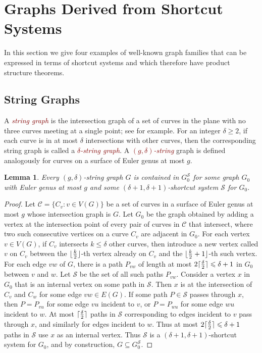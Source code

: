 \documentclass{patmorin}
\theoremstyle{plain}
\newtheorem{lem}[thm]{Lemma}
\theoremstyle{definition}
\newcommand{\defin}[1]{\textcolor{Maroon}{\emph{#1}}}
\DeclarePairedDelimiter{\ceil}{\lceil}{\rceil}
\DeclarePairedDelimiter{\floor}{\lfloor}{\rfloor}
\renewcommand{\SS}{\mathcal{S}}
\renewcommand{\geq}{\geqslant}
\renewcommand{\leq}{\leqslant}
\begin{document}
\section{Graphs Derived from Shortcut Systems}
\label{examples}

In this section we give four examples of well-known graph families that can be expressed in terms of shortcut systems and which therefore have product structure theorems.


\subsection{String Graphs}
\label{first_example}

A \defin{string graph} is the intersection graph of a set of curves in the plane with no three curves meeting at a single point; see  \cite{PachToth-DCG02,FP10,FP14} for example. For an integer $\delta\geq 2$, if each curve is in at most $\delta$ intersections with other curves, then the corresponding string graph is called a \defin{$\delta$-string graph}. A \defin{$(g,\delta)$-string} graph is defined analogously for curves on a surface of Euler genus at most $g$.

\begin{lem}
\label{StringShortcut}
Every $(g,\delta)$-string graph $G$ is contained in $G_0^\SS$ for some graph $G_0$ with Euler genus at most $g$ and some $(\delta+1,\delta+1 )$-shortcut system $\SS$ for $G_0$.
\end{lem}

\begin{proof}
Let $\mathcal{C}=\{C_v:v\in V(G)\}$ be a set of curves in a surface of Euler genus at most $g$ whose intersection graph is $G$.  Let $G_0$ be the graph obtained by adding a vertex at the intersection point of every pair of curves in $\mathcal{C}$ that intersect,  where two such consecutive vertices on a curve $C_v$ are adjacent in $G_0$. For each vertex $v\in V(G)$, if $C_v$ intersects $k\leq\delta$ other curves, then introduce a new vertex called $v$ on $C_v$ between the
$\floor{\frac{k}{2}}$-th vertex already on $C_v$ and the $\floor{\frac{k}{2}+1}$-th such vertex. For each edge $vw$ of $G$, there is a path $P_{vw}$ of length at most $2\ceil{\frac{\delta}{2}}\leq \delta+1$ in $G_0$ between $v$ and $w$. Let $\SS$ be the set of all such paths $P_{vw}$. Consider a vertex $x$ in $G_0$ that is an internal vertex on some path in $\SS$. Then $x$ is at the intersection of $C_v$ and $C_w$ for some edge $vw\in E(G)$. If some path $P\in \SS$ passes through $x$, then $P=P_{vu}$ for some edge $vu$ incident to $v$, or $P=P_{wu}$ for some edge $wu$ incident to $w$. At most $\ceil{\frac{\delta}{2}}$ paths in $\SS$ corresponding to edges incident to $v$ pass through $x$, and similarly for edges incident to $w$. Thus at most $2\ceil{\frac{\delta}{2}}\leq\delta+1$ paths in $\SS$ use $x$ as an internal vertex. Thus $\SS$ is a $(\delta+1,\delta+1)$-shortcut system for $G_0$, and by construction, $G \subseteq G_0^\SS$.
\end{proof}
\end{document}

